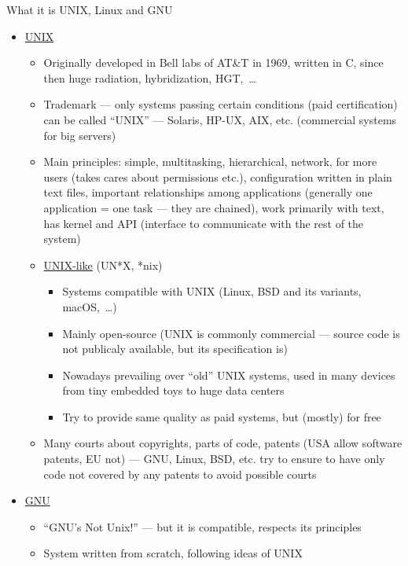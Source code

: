 \documentclass[compress, ucs, xelatex, 11pt, xcolor=svgnames, aspectratio=169,
	hyperref={
		bookmarks=true,
		unicode=true,
		colorlinks=true,
		pdftitle={Linux, command line and MetaCentrum},
		plainpages=false,
		pdfauthor={Vojtech Zeisek},
		pdfsubject={Course about use of Linux command line, writing shell scripts and using MetaCentrum of CESNET},
		pdfcreator={XeLaTeX},
		pdfkeywords={Linux, GNU, BASH, shell, command line, MetaCentrum},
		linkcolor=DarkRed, %
		anchorcolor=DarkBlue, %
		citecolor=Indigo, %
		filecolor=NavyBlue, %
		menucolor=DarkMagenta, %
		urlcolor=DarkBlue, %
		pdftex},
	url={hyphens, lowtilde} %
	]{beamer}
\begin{document}
\begin{frame}[allowframebreaks]{What it is UNIX, Linux and GNU}
	\begin{itemize}
		\item \href{https://en.wikipedia.org/wiki/Unix}{UNIX}
		\begin{itemize}
			\item Originally developed in Bell labs of AT\&T in 1969, written in C, since then  huge radiation, hybridization, HGT,~\ldots
			\item Trademark --- only systems passing certain conditions (paid certification) can be called \enquote{UNIX} --- Solaris, HP-UX, AIX, etc. (commercial systems for big servers)
			\item Main principles: simple, multitasking, hierarchical, network, for more users (takes cares about permissions etc.), configuration written in plain text files, important relationships among applications (generally one application = one task --- they are chained), work primarily with text, has kernel and API (interface to communicate with the rest of the system)
			\item \href{https://en.wikipedia.org/wiki/Unix-like}{UNIX-like} (UN*X, *nix)
			\begin{itemize}
				\item Systems compatible with UNIX (Linux, BSD and its variants, macOS,~\ldots)
				\item Mainly open-source (UNIX is commonly commercial --- source code is not publicaly available, but its specification is)
				\item Nowadays prevailing over \enquote{old} UNIX systems, used in many devices from tiny embedded toys to huge data centers
				\item Try to provide same quality as paid systems, but (mostly) for free
			\end{itemize}
			\item Many courts about copyrights, parts of code, patents (USA allow software patents, EU not) --- GNU, Linux, BSD, etc. try to ensure to have only code not covered by any patents to avoid possible courts
		\end{itemize}
		\item \href{https://www.gnu.org/}{GNU}
		\begin{itemize}
			\item \enquote{GNU's Not Unix!} --- but it is compatible, respects its principles
			\item System written from scratch, following ideas of UNIX

\end{itemize}
\end{itemize}
\end{frame}
\end{document}
